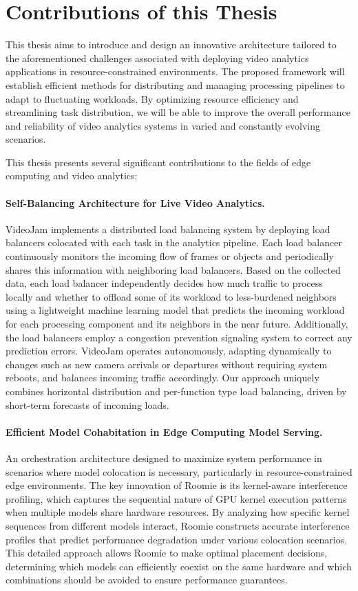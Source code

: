 \section{Contributions of this Thesis}

This thesis aims to introduce and design an innovative architecture tailored to the aforementioned challenges associated with deploying video analytics applications in resource-constrained environments. The proposed framework will establish efficient methods for distributing and managing processing pipelines to adapt to fluctuating workloads. By optimizing resource efficiency and streamlining task distribution, we will be able to improve the overall performance and reliability of video analytics systems in varied and constantly evolving scenarios.

This thesis presents several significant contributions to the fields of edge computing and video analytics:

\paragraph{Self-Balancing Architecture for Live Video Analytics.} VideoJam implements a distributed load balancing system by deploying load balancers colocated with each task in the analytics pipeline. Each load balancer continuously monitors the incoming flow of frames or objects and periodically shares this information with neighboring load balancers. Based on the collected data, each load balancer independently decides how much traffic to process locally and whether to offload some of its workload to less-burdened neighbors using a lightweight machine learning model that predicts the incoming workload for each processing component and its neighbors in the near future. Additionally, the load balancers employ a congestion prevention signaling system to correct any prediction errors. VideoJam operates autonomously, adapting dynamically to changes such as new camera arrivals or departures without requiring system reboots, and balances incoming traffic accordingly. Our approach uniquely combines horizontal distribution and per-function type load balancing, driven by short-term forecasts of incoming loads.

\paragraph{Efficient Model Cohabitation in Edge Computing Model Serving.} An orchestration architecture designed to maximize system performance in scenarios where model colocation is necessary, particularly in resource-constrained edge environments. The key innovation of Roomie is its kernel-aware interference profiling, which captures the sequential nature of GPU kernel execution patterns when multiple models share hardware resources. By analyzing how specific kernel sequences from different models interact, Roomie constructs accurate interference profiles that predict performance degradation under various colocation scenarios. This detailed approach allows Roomie to make optimal placement decisions, determining which models can efficiently coexist on the same hardware and which combinations should be avoided to ensure performance guarantees.

